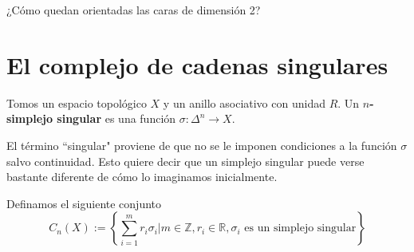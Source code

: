 \documentclass[spanish]{book}
\theoremstyle{definition}
\newcommand{\R}{\mathbb{R}}
\newcommand{\Z}{\mathbb{Z}}
\begin{document}
¿Cómo quedan orientadas las caras de dimensión 2?

\section{El complejo de cadenas singulares}
Tomos un espacio topológico  $X$  y un anillo asociativo con unidad $R$. Un \textbf{$n$-simplejo singular} es una función $\sigma:\Delta^n\to X$.

El término ``singular" proviene de que no se le imponen condiciones a la función $\sigma$ salvo continuidad. Esto quiere decir que un simplejo singular puede verse bastante diferente de cómo lo imaginamos inicialmente.

Definamos el siguiente conjunto 
$$C_n(X):=\left\{\sum_{i=1}^mr_i\sigma_i|m\in\Z,r_i\in\R,\sigma_i\text{ es un simplejo singular}\right\}$$
\end{document}
